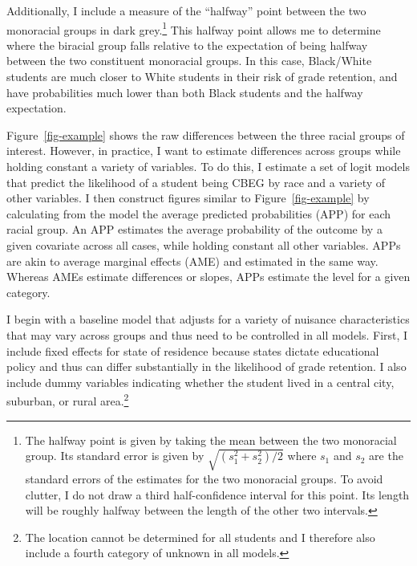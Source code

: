 \documentclass[
  letterpaper,
  DIV=11,
  numbers=noendperiod]{scrartcl}
\begin{document}
Additionally, I include a measure of the ``halfway'' point between the
two monoracial groups in dark grey.\footnote{The halfway point is given
  by taking the mean between the two monoracial group. Its standard
  error is given by \(\sqrt{(s_1^2+s_2^2)/2}\) where \(s_1\) and \(s_2\)
  are the standard errors of the estimates for the two monoracial
  groups. To avoid clutter, I do not draw a third half-confidence
  interval for this point. Its length will be roughly halfway between
  the length of the other two intervals.} This halfway point allows me
to determine where the biracial group falls relative to the expectation
of being halfway between the two constituent monoracial groups. In this
case, Black/White students are much closer to White students in their
risk of grade retention, and have probabilities much lower than both
Black students and the halfway expectation.

Figure~\ref{fig-example} shows the raw differences between the three
racial groups of interest. However, in practice, I want to estimate
differences across groups while holding constant a variety of variables.
To do this, I estimate a set of logit models that predict the likelihood
of a student being CBEG by race and a variety of other variables. I then
construct figures similar to Figure~\ref{fig-example} by calculating
from the model the average predicted probabilities (APP) for each racial
group. An APP estimates the average probability of the outcome by a
given covariate across all cases, while holding constant all other
variables. APPs are akin to average marginal effects (AME) and estimated
in the same way. Whereas AMEs estimate differences or slopes, APPs
estimate the level for a given category.

I begin with a baseline model that adjusts for a variety of nuisance
characteristics that may vary across groups and thus need to be
controlled in all models. First, I include fixed effects for state of
residence because states dictate educational policy and thus can differ
substantially in the likelihood of grade retention. I also include dummy
variables indicating whether the student lived in a central city,
suburban, or rural area.\footnote{The location cannot be determined for
  all students and I therefore also include a fourth category of unknown
  in all models.}
\end{document}

